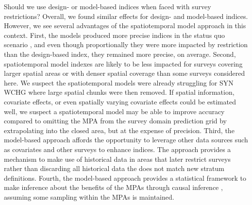 \documentclass[12pt]{article}
\begin{document}
Should we use design- or model-based indices when faced with survey restrictions?
Overall, we found similar effects for design- and model-based indices.
However, we see several advantages of the spatiotemporal model approach in this context.
First, the models produced more precise indices in the status quo scenario \citep[sensu][]{thorson2015a}, and even though proportionally they were more impacted by restriction than the design-based index, they remained more precise, on average.
Second, spatiotemporal model indexes are likely to be less impacted for surveys covering larger spatial areas or with denser spatial coverage than some surveys considered here.
We suspect the spatiotemporal models were already struggling for SYN WCHG where large spatial chunks were then removed.
If spatial information, covariate effects, or even spatially varying covariate effects \citep{hastie1993, barnett2021a, thorson2023svc} could be estimated well, we suspect a spatiotemporal model may be able to improve accuracy compared to omitting the MPA from the survey domain prediction grid by extrapolating into the closed area, but at the expense of precision.
Third, the model-based approach affords the opportunity to leverage other data sources such as covariates \citep{johnson2019} and other surveys \citep[e.g.,][]{gruss2019, webster2020, monnahan2021} to enhance indices.
The approach provides a mechanism to make use of historical data in areas that later restrict surveys rather than discarding all historical data the does not match new stratum definitions.
Fourth, the model-based approach provides a statistical framework to make inference about the benefits of the MPAs through causal inference \citep[e.g.,][]{pearl2016}, assuming some sampling within the MPAs is maintained.
\end{document}
